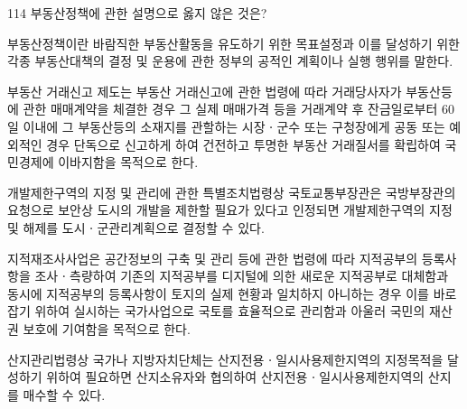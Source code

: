 \begin{question}{114}
부동산정책에 관한 설명으로 옳지 않은 것은?
\begin{choices}
  \item 부동산정책이란 바람직한 부동산활동을 유도하기 위한 목표설정과 이를 달성하기 위한 각종 부동산대책의 결정 및 운용에 관한 정부의 공적인 계획이나 실행 행위를 말한다.
  \item 부동산 거래신고 제도는 부동산 거래신고에 관한 법령에 따라 거래당사자가 부동산등에 관한 매매계약을 체결한 경우 그 실제 매매가격 등을 거래계약 후 잔금일로부터 60일 이내에 그 부동산등의 소재지를 관할하는 시장ㆍ군수 또는 구청장에게 공동 또는 예외적인 경우 단독으로 신고하게 하여 건전하고 투명한 부동산 거래질서를 확립하여 국민경제에 이바지함을 목적으로 한다.
  \item 개발제한구역의 지정 및 관리에 관한 특별조치법령상 국토교통부장관은 국방부장관의 요청으로 보안상 도시의 개발을 제한할 필요가 있다고 인정되면 개발제한구역의 지정 및 해제를 도시ㆍ군관리계획으로 결정할 수 있다.
  \item 지적재조사사업은 공간정보의 구축 및 관리 등에 관한 법령에 따라 지적공부의 등록사항을 조사ㆍ측량하여 기존의 지적공부를 디지털에 의한 새로운 지적공부로 대체함과 동시에 지적공부의 등록사항이 토지의 실제 현황과 일치하지 아니하는 경우 이를 바로 잡기 위하여 실시하는 국가사업으로 국토를 효율적으로 관리함과 아울러 국민의 재산권 보호에 기여함을 목적으로 한다.
  \item 산지관리법령상 국가나 지방자치단체는 산지전용ㆍ일시사용제한지역의 지정목적을 달성하기 위하여 필요하면 산지소유자와 협의하여 산지전용ㆍ일시사용제한지역의 산지를 매수할 수 있다.
\end{choices}
\end{question}
